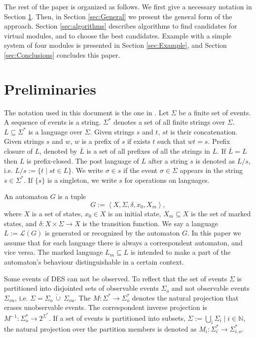 \documentclass[a4paper, 10pt, conference]{ieeeconf}
\begin{document}
The rest of the paper is organized as follows. We first give a necessary
notation in Section \ref{sec:Preliminaries}. Then, in Section \ref{sec:General}
we present the general form of the approach. Section \ref{sec:algorithms}
describes algorithms to find candidates for virtual modules, and to choose the
best candidates. Example with a simple system of four modules is presented in
Section \ref{sec:Example}, and Section \ref{sec:Conclusions} concludes this
paper.


\section{Preliminaries}
\label{sec:Preliminaries}

The notation used in this document is the one in
\cite{cassandras_introduction_2010}.
Let $\Sigma$ be a finite set of events. A sequence of events is a string.
$\Sigma^*$ denotes a set of all finite strings over $\Sigma$.
$L\subseteq\Sigma^*$ is a language over $\Sigma$. Given strings $s$ and $t$,
$st$ is their concatenation. Given strings $s$ and $w$, $w$ is a prefix of $s$
if exists $t$ such that $wt = s$. Prefix closure of $L$, denoted by
$\overline{L}$ is a set of all prefixes of all the strings in $L$.
If $\overline{L} = L$ then $L$ is prefix-closed. The post language of $L$ after
a string $s$ is denoted as $L/s$, i.e. $L/s := \{t\mid st \in L\}$. We
write $\sigma \in s$ if the event $\sigma \in \Sigma$ appears in the string $s
\in \Sigma^*$. If $\{s\}$ is a singleton, we write $s$ for operations on
languages.

An automaton $G$ is a tuple $$G := \left< X,\Sigma,\delta,x_0, X_m \right>,$$
where $X$ is a set of states, $x_0 \in X$ is an initial state, $X_m \subseteq X$
is the set of marked states, and $\delta: X \times \Sigma \rightarrow X$ is the
transition function.
We say a language $L := \mathcal{L}(G)$ is generated or recognized by the
automaton $G$. In this paper we assume that for each language there is always a
correspondent automaton, and vice versa. The marked language $L_m \subseteq L$
is intended to make a part of the automaton's behaviour distinguishable in a
certain context.

Some events of DES can not be observed. To reflect that the set of events
$\Sigma$ is partitioned into disjointed sets of observable events $\Sigma_o$ and
not observable events $\Sigma_{ou}$, i.e. $\Sigma = \Sigma_o~\dot{\cup}~
\Sigma_{ou}$.
The $M: \Sigma^* \rightarrow \Sigma_o^*$ denotes the natural projection that
erases unobservable events.
The correspondent inverse projection is $M^{-1}: \Sigma_o^* \rightarrow
2^{\Sigma^*}$.
If a set of events is partitioned into subsets, $\Sigma := \bigcup_i
\Sigma_{i} \mid i \in \mathbb{N}$, the natural projection over the partition
members is denoted as $M_i: \Sigma_i^* \rightarrow \Sigma_{i,o}^*$.
\end{document}
